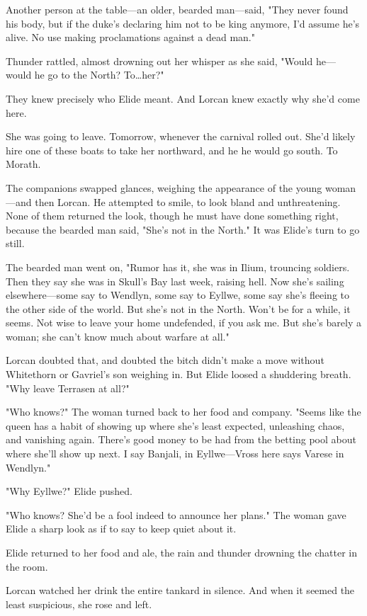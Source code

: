 Another person at the table---an older, bearded man---said, "They never found his body, but if the duke's declaring him not to be king anymore, I'd assume he's alive.
No use making proclamations against a dead man."

Thunder rattled, almost drowning out her whisper as she said, "Would he--- would he go to the North?
To\ldots her?"

They knew precisely who Elide meant.
And Lorcan knew exactly why she'd come here.

She was going to leave.
Tomorrow, whenever the carnival rolled out.
She'd likely hire one of these boats to take her northward, and he  he would go south.
To Morath.

The companions swapped glances, weighing the appearance of the young woman---and then Lorcan.
He attempted to smile, to look bland and unthreatening.
None of them returned the look, though he must have done something right, because the bearded man said, "She's not in the North."
It was Elide's turn to go still.

The bearded man went on, "Rumor has it, she was in Ilium, trouncing soldiers.
Then they say she was in Skull's Bay last week, raising hell.
Now she's sailing elsewhere---some say to Wendlyn, some say to Eyllwe, some say she's fleeing to the other side of the world.
But she's not in the North.
Won't be for a while, it seems.
Not wise to leave your home undefended, if you ask me.
But she's barely a woman; she can't know much about warfare at all."

Lorcan doubted that, and doubted the bitch didn't make a move without Whitethorn or Gavriel's son weighing in.
But Elide loosed a shuddering breath.
"Why leave Terrasen at all?"

"Who knows?"
The woman turned back to her food and company.
"Seems like the queen has a habit of showing up where she's least expected, unleashing chaos, and vanishing again.
There's good money to be had from the betting pool about where she'll show up next.
I say Banjali, in Eyllwe---Vross here says Varese in Wendlyn."

"Why Eyllwe?"
Elide pushed.

"Who knows?
She'd be a fool indeed to announce her plans."
The woman gave Elide a sharp look as if to say to keep quiet about it.

Elide returned to her food and ale, the rain and thunder drowning the chatter in the room.

Lorcan watched her drink the entire tankard in silence.
And when it seemed the least suspicious, she rose and left.

